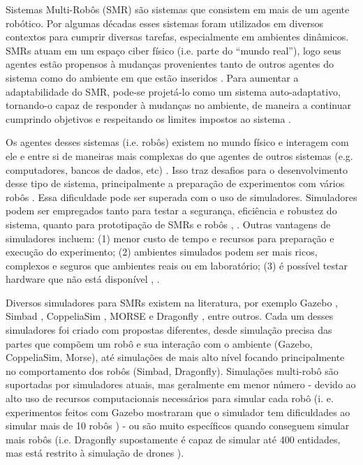 \label{chapter:intro}

Sistemas Multi-Robôs (SMR) são sistemas que consistem em mais de um agente robótico. Por algumas décadas esses sistemas foram utilizados em diversos contextos para cumprir diversas tarefas, especialmente em ambientes dinâmicos. SMRs atuam em um espaço ciber físico (i.e. parte do “mundo real”), logo seus agentes estão propensos à mudanças provenientes tanto de outros agentes do sistema como do ambiente em que estão inseridos \cite{iocchi2000reactivity}. Para aumentar a adaptabilidade do SMR, pode-se projetá-lo como um sistema auto-adaptativo, tornando-o capaz de responder à mudanças no ambiente, de maneira a continuar cumprindo objetivos e respeitando os limites impostos ao sistema \cite{sykes2010autonomous}.

Os agentes desses sistemas (i.e. robôs) existem no mundo físico e interagem com ele e entre si de maneiras mais complexas do que agentes de outros sistemas (e.g. computadores, bancos de dados, etc) \cite{cao1997cooperative}. Isso traz desafios para o desenvolvimento desse tipo de sistema, principalmente a preparação de experimentos com vários robôs \cite{noori20173d}. Essa dificuldade pode ser superada com o uso de simuladores. Simuladores podem ser empregados tanto para testar a segurança, eficiência e robustez do sistema, quanto para prototipação de SMRs e robôs \cite{noori20173d}, \cite{pinciroli2012argos}. Outras vantagens de simuladores incluem: (1) menor custo de tempo e recursos para preparação e execução do experimento; (2) ambientes simulados podem ser mais ricos, complexos e seguros que ambientes reais ou em laboratório; (3) é possível testar hardware que não está disponível \cite{pinciroli2012argos}, \cite{echeverria2011morse}.  

Diversos simuladores para SMRs existem na literatura, por exemplo Gazebo \cite{koenig2004gazebo}, Simbad \cite{hugues2006simbad}, CoppeliaSim \cite{rohmer2013coopeliasim}, MORSE \cite{echeverria2011morse} e Dragonfly \cite{maia2019dragonfly}, entre outros. Cada um desses simuladores foi criado com propostas diferentes, desde simulação precisa das partes que compõem um robô e sua interação com o ambiente (Gazebo, CoppeliaSim, Morse), até simulações de mais alto nível focando principalmente no comportamento dos robôs (Simbad, Dragonfly). Simulações multi-robô são suportadas por simuladores atuais, mas geralmente em menor número - devido ao alto uso de recursos computacionais necessários para simular cada robô (i. e. experimentos feitos com Gazebo mostraram que o simulador tem dificuldades ao simular mais de 10 robôs \cite{noori20173d}) - ou são muito específicos quando conseguem simular mais robôs (i.e. Dragonfly supostamente é capaz de simular até 400 entidades, mas está restrito à simulação de drones \cite{maia2019dragonfly}).

